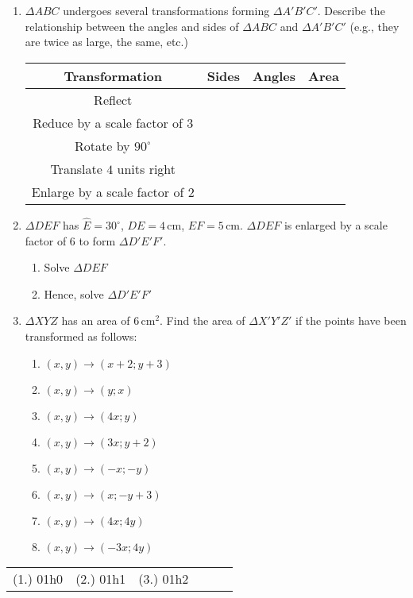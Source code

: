 \begin{eocexercises}{}
\begin{enumerate}
\item $\Delta ABC$ undergoes several transformations forming $\Delta A' B' C'$. Describe the relationship between the angles and sides of $\Delta ABC$ and $\Delta A' B' C'$ (e.g., they are twice as large, the same, etc.)

\begin{tabular}{|c|c|c|c|}
\hline
Transformation & Sides & Angles & Area \\
\hline
Reflect & & & \\
\hline
Reduce by a scale factor of $3$ & & & \\
\hline
Rotate by $90^\circ$ & & & \\
\hline
Translate $4$ units right & & & \\
\hline
Enlarge by a scale factor of $2$ & & & \\
\hline
\end{tabular}

\item $\Delta DEF$ has $\hat{E} = 30^\circ$, $DE = 4\,\mbox{cm}$, $EF = 5\,\mbox{cm}$. $\Delta DEF$ is enlarged by a scale factor of $6$ to form $\Delta D'E'F'$.
\begin{enumerate}
\item Solve $\Delta DEF$
\item Hence, solve $\Delta D'E'F'$
\end{enumerate}

\item $\Delta XYZ$ has an area of $6\,\mbox{cm}^2$. Find the area of $\Delta X'Y'Z'$ if the points have been transformed as follows:
\begin{enumerate}
\newcommand{\tf}[1]{\item $(x, y)\rightarrow(#1)$}
\tf{x+2; y+3}
\tf{y; x}
\tf{4x; y}
\tf{3x; y+2}
\tf{-x; -y}
\tf{x; -y+3}
\tf{4x; 4y}
\tf{-3x; 4y}
\end{enumerate}

\end{enumerate}





\par \practiceinfo
\par \begin{tabular}[h]{cccccc}
(1.)	01h0	&
(2.)	01h1	&
(3.)	01h2	&
\end{tabular}
\end{eocexercises}
